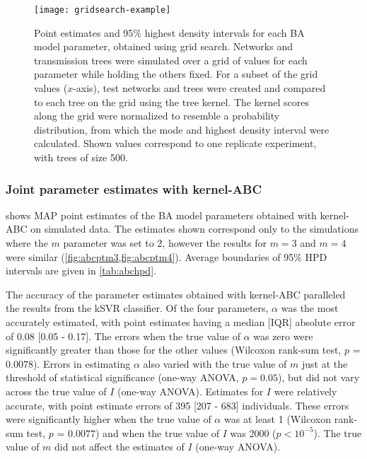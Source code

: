 \begin{figure}[ht]
  \centering
  \texttt{[image: gridsearch-example]}
  \caption[Grid search estimates of \gls{BA} model parameters.]{Point estimates
      and 95\% highest density intervals for each \gls{BA} model parameter,
      obtained using grid search. Networks and transmission trees were
      simulated over a grid of values for each parameter while holding the
      others fixed. For a subset of the grid values ($x$-axis), test networks
      and trees were created and compared to each tree on the grid using the
      tree kernel. The kernel scores along the grid were normalized to resemble
      a probability distribution, from which the mode and highest density
      interval were calculated. Shown values correspond to one replicate
      experiment, with trees of size 500.
  } 
  \label{fig:gridest}
\end{figure}

\subsubsection*{Joint parameter estimates with kernel-ABC}



 shows \gls{MAP} point estimates of the BA model parameters
obtained with kernel-ABC on simulated data. The estimates shown correspond only
to the simulations where the $m$ parameter was set to 2, however the results
for $m = 3$ and $m = 4$ were similar (\cref{fig:abcptm3,fig:abcptm4}). Average
boundaries of 95\% HPD intervals are given in \cref{tab:abchpd}.

The accuracy of the parameter estimates obtained with kernel-ABC
paralleled the results from the \gls{kSVR} classifier. Of the four parameters,
$\alpha$ was the most accurately estimated, with point estimates having a
median [IQR] absolute error of 
    0.08 
    [0.05 - 
    0.17].
The errors when the true value of $\alpha$ was zero were significantly greater
than those for the other values 
    (Wilcoxon rank-sum test, $p$ = $0.0078$).
Errors in estimating $\alpha$ also varied with the true value of $m$ just at
the threshold of statistical significance
    (one-way ANOVA, $p 
    =0.05$),
but did not vary across the true value of $I$ (one-way ANOVA). Estimates for
$I$ were relatively accurate, with point estimate errors of
    395 
    [207 - 
    683] individuals.
These errors were significantly higher when the true value of $\alpha$ was
at least 1
    (Wilcoxon rank-sum test, $p$ = $0.0077$)
and when the true value of $I$ was 2000 ($p < 10^{-5}$). The true value of $m$
did not affect the estimates of $I$ (one-way ANOVA).

